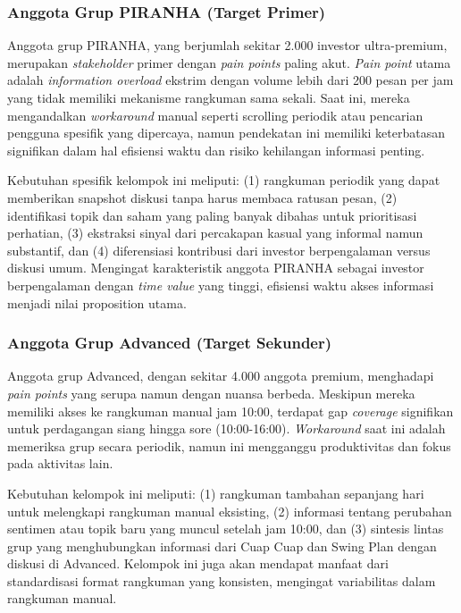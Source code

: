 \subsubsection{Anggota Grup PIRANHA (Target Primer)}

Anggota grup PIRANHA, yang berjumlah sekitar 2.000 investor ultra-premium, merupakan \textit{stakeholder} primer dengan \textit{pain points} paling akut. \textit{Pain point} utama adalah \textit{information overload} ekstrim dengan volume lebih dari 200 pesan per jam yang tidak memiliki mekanisme rangkuman sama sekali. Saat ini, mereka mengandalkan \textit{workaround} manual seperti scrolling periodik atau pencarian pengguna spesifik yang dipercaya, namun pendekatan ini memiliki keterbatasan signifikan dalam hal efisiensi waktu dan risiko kehilangan informasi penting.

Kebutuhan spesifik kelompok ini meliputi: (1) rangkuman periodik yang dapat memberikan snapshot diskusi tanpa harus membaca ratusan pesan, (2) identifikasi topik dan saham yang paling banyak dibahas untuk prioritisasi perhatian, (3) ekstraksi sinyal dari percakapan kasual yang informal namun substantif, dan (4) diferensiasi kontribusi dari investor berpengalaman versus diskusi umum. Mengingat karakteristik anggota PIRANHA sebagai investor berpengalaman dengan \textit{time value} yang tinggi, efisiensi waktu akses informasi menjadi nilai proposition utama.

\subsubsection{Anggota Grup Advanced (Target Sekunder)}

Anggota grup Advanced, dengan sekitar 4.000 anggota premium, menghadapi \textit{pain points} yang serupa namun dengan nuansa berbeda. Meskipun mereka memiliki akses ke rangkuman manual jam 10:00, terdapat gap \textit{coverage} signifikan untuk perdagangan siang hingga sore (10:00-16:00). \textit{Workaround} saat ini adalah memeriksa grup secara periodik, namun ini mengganggu produktivitas dan fokus pada aktivitas lain.

Kebutuhan kelompok ini meliputi: (1) rangkuman tambahan sepanjang hari untuk melengkapi rangkuman manual eksisting, (2) informasi tentang perubahan sentimen atau topik baru yang muncul setelah jam 10:00, dan (3) sintesis lintas grup yang menghubungkan informasi dari Cuap Cuap dan Swing Plan dengan diskusi di Advanced. Kelompok ini juga akan mendapat manfaat dari standardisasi format rangkuman yang konsisten, mengingat variabilitas dalam rangkuman manual.

